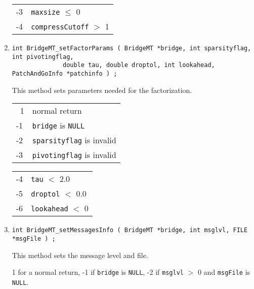 \begin{enumerate}
\begin{center}
\begin{tabular}{ll}
-3 & \texttt{maxsize} $\le$ 0 \\
-4 & \texttt{compressCutoff} $>$ 1
\end{tabular}
\end{center}
\item
\begin{verbatim}
int BridgeMT_setFactorParams ( BridgeMT *bridge, int sparsityflag, int pivotingflag, 
              double tau, double droptol, int lookahead, PatchAndGoInfo *patchinfo ) ;
\end{verbatim}
This method sets parameters needed for the factorization.
\par {}
\begin{center}
\begin{tabular}{ll}
~1 & normal return \\
-1 & \texttt{bridge} is \texttt{NULL} \\
-2 & \texttt{sparsityflag} is invalid \\
-3 & \texttt{pivotingflag} is invalid 
\end{tabular}
\begin{tabular}{ll}
-4 & \texttt{tau} $<$ 2.0 \\
-5 & \texttt{droptol} $<$ 0.0 \\
-6 & \texttt{lookahead} $<$ 0
\end{tabular}
\end{center}
\item
\begin{verbatim}
int BridgeMT_setMessagesInfo ( BridgeMT *bridge, int msglvl, FILE *msgFile ) ;
\end{verbatim}
This method sets the message level and file.
\par {}
1 for a  normal return,
-1 if \texttt{bridge} is \texttt{NULL},
-2 if \texttt{msglvl} $>$ 0 and \texttt{msgFile} is \texttt{NULL}.
\end{enumerate}
\par
